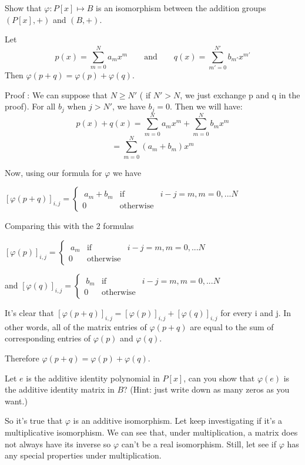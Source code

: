 \begin{exercise}{}
	Show that $\varphi : P[x] \mapsto B$ is an isomorphism between the addition groups $( P[x] , +)$ and $(B, +)$.
\end{exercise}
\begin{prop}{}
	Let  \[p(x) = \sum^ {N}_{m=0} a_{m}x^{m}\qquad \text{and}\qquad q(x) = \sum^ {N'}_{m'=0} b_{m'}x^{m'}\]
	Then $\varphi(p + q) = \varphi(p) + \varphi(q)$.
	
	Proof : We can suppose that $ N \geq N' $ ( if $N'> N$, we just exchange p and q in the proof). For all $b_j$ when $j>N'$, we have $b_j=0$. Then we will have:
	\[p(x) + q(x) = \sum^ {N}_{m=0} a_{m}x^{m} + \sum^{N}_{m=0} b_{m}x^{m}\] 
	\[=\sum^{N}_{m=0}(a_{m} + b_{m})x^{m}\]
	
	Now, using our formula for $\varphi$ we have
	
	$[\varphi(p + q)]_{i, j} = \left\{\begin{array}{rcl}\ a_m + b_m   &\mbox{if}&   i - j = m,  m = 0,...N \\ 0   &\mbox{otherwise}& \end{array}\right.$
	
	Comparing this with the 2 formulas
	
	$[\varphi(p)]_{i, j} = \left\{\begin{array}{rcl}\ a_m   &\mbox{if}&   i - j = m,  m = 0,...N \\ 0   &\mbox{otherwise}& \end{array}\right.$
	
	and 
	$[\varphi(q)]_{i, j} = \left\{\begin{array}{rcl}\ b_m   &\mbox{if}&   i - j = m,  m = 0,...N \\ 0   &\mbox{otherwise}& \end{array}\right.$
	
	It's clear that $[\varphi(p + q)]_{i, j} = [\varphi(p)]_{i, j} + [\varphi(q)]_{i, j}$ for every i and j. In other words, all of the matrix entries  of $\varphi(p + q)$ are equal to the sum of corresponding entries of $\varphi(p)$ and $\varphi(q)$.
	
	Therefore $\varphi(p + q) = \varphi(p) + \varphi(q)$.
\end{prop}
\begin{exercise}{}
Let $e$ is the additive identity polynomial in $P[x]$, can you show that $\varphi(e)$ is the additive identity matrix in $B$? (Hint: just write down as many zeros as you want.)
\end{exercise}
So it's true that $\varphi$ is an additive isomorphism. Let keep investigating if it's a multiplicative isomorphism. We can see that, under multiplication, a matrix does not always have its inverse so $\varphi$ can't be a real isomorphism. Still, let see if $\varphi$ has any special properties under multiplication.

